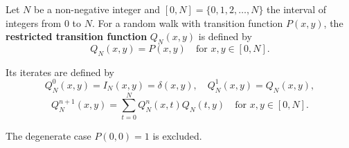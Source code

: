 Let $N$ be a non-negative integer and $[0,N] = \{0,1,2,\ldots,N\}$ the interval of integers from $0$ to $N$. For a random walk with transition function $P(x,y)$, the \textbf{restricted transition function} $Q_N(x,y)$ is defined by
$$Q_N(x,y) = P(x,y) \quad \text{for } x,y \in [0,N].$$

Its iterates are defined by
$$Q_N^0(x,y) = I_N(x,y) = \delta(x,y), \quad Q_N^1(x,y) = Q_N(x,y),$$
$$Q_N^{n+1}(x,y) = \sum_{t=0}^{N} Q_N^n(x,t) Q_N(t,y) \quad \text{for } x,y \in [0,N].$$

The degenerate case $P(0,0) = 1$ is excluded.
